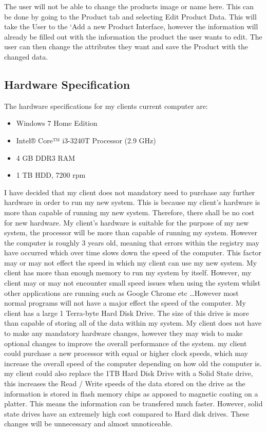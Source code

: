 The user will not be able to change the products image or name here. This can be done by going to the Product tab and selecting Edit Product Data. This will take the User to the `Add a new Product Interface, however the information will already be filled out with the information the product the user wants to edit. The user can then change the attributes they want and save the Product with the changed data. 

\subsection{Hardware Specification}
	
The hardware specifications for my clients current computer are: \par

\begin{itemize}
\item Windows 7 Home Edition
\item Intel® Core™ i3-3240T Processor (2.9 GHz)
\item 4 GB DDR3 RAM
\item 1 TB HDD, 7200 rpm
\end{itemize}




I have decided that my client does not mandatory need to purchase any further hardware in order to run my new system. This is because my client's hardware is more than capable of running my new system. Therefore, there shall be no cost for new hardware. My client's hardware is suitable for the purpose of my new system, the processor will be more than capable of running my system. However the computer is roughly 3 years old, meaning that errors within the registry may have occurred which over time slows down the speed of the computer. This factor may or may not effect the speed in which my client can use my new system. My client has more than enough memory to run my system by itself. However, my client may or may not encounter small speed issues when using the system whilst other applications are running such as Google Chrome etc \ldots However most normal programs will not have a major effect the speed of the computer.  My client has a large 1 Terra-byte Hard Disk Drive. The size of this drive is more than capable of storing all of the data within my system. My client does not have to make any mandatory hardware changes, however they may wish to make optional changes to improve the overall performance of the system. my client could purchase a new processor with equal or higher clock speeds, which may increase the overall speed of the computer depending on how old the computer is.  my client could also replace the 1TB Hard Disk Drive with a Solid State drive, this increases the Read / Write speeds of the data stored on the drive as the information is stored in flash memory chips as apposed to magnetic coating on a platter. This means the information can be transfered much faster. However, solid state drives have an extremely high cost compared to Hard disk drives. These changes will be unnecessary and almost unnoticeable.

